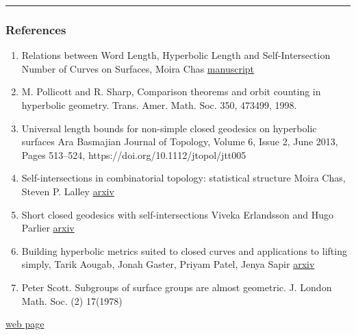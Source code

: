 \documentclass[
]{article}
\providecommand{\tightlist}{%
  \setlength{\itemsep}{0pt}\setlength{\parskip}{0pt}}
\begin{document}
\begin{center}\rule{0.5\linewidth}{0.5pt}\end{center}

\hypertarget{references}{%
\subsubsection{References}\label{references}}

\begin{enumerate}
\def\labelenumi{\arabic{enumi}.}
\tightlist
\item
  Relations between Word Length, Hyperbolic Length and Self-Intersection
  Number of Curves on Surfaces, Moira Chas
  \href{http://www.math.stonybrook.edu/~moira/papers/2015ChasRelations_between_Word_Length_Hyperbolic_Length_and_Self-Intersection_Number_of_Curves_on_Surfaces.pdf}{manuscript}
\item
  M. Pollicott and R. Sharp, Comparison theorems and orbit counting in
  hyperbolic geometry. Trans. Amer. Math. Soc. 350, 473499, 1998.
\item
  Universal length bounds for non-simple closed geodesics on hyperbolic
  surfaces Ara Basmajian Journal of Topology, Volume 6, Issue 2, June
  2013, Pages 513--524, https://doi.org/10.1112/jtopol/jtt005
\item
  Self-intersections in combinatorial topology: statistical structure
  Moira Chas, Steven P. Lalley
  \href{https://arxiv.org/abs/1012.0580}{arxiv}
\item
  Short closed geodesics with self-intersections Viveka Erlandsson and
  Hugo Parlier \href{https://arxiv.org/pdf/1609.00217.pdf}{arxiv}
\item
  Building hyperbolic metrics suited to closed curves and applications
  to lifting simply, Tarik Aougab, Jonah Gaster, Priyam Patel, Jenya
  Sapir \href{https://arxiv.org/abs/1603.06303}{arxiv}
\item
  Peter Scott. Subgroups of surface groups are almost geometric. J.
  London Math. Soc. (2) 17(1978)
\end{enumerate}

\href{https://github.com/macbuse/MATH/edit/master/stage\%20m2r\%202020_bis.md}{web
page}
\end{document}
